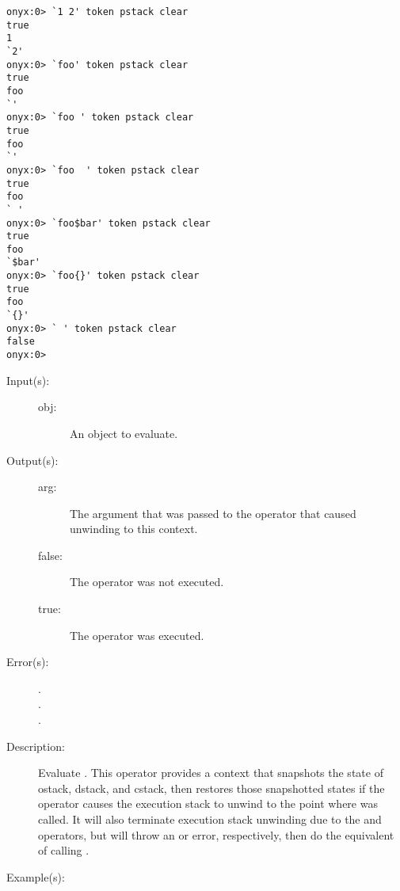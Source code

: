 \begin{description}
\begin{description}
\begin{verbatim}
onyx:0> `1 2' token pstack clear
true
1
`2'
onyx:0> `foo' token pstack clear
true
foo
`'
onyx:0> `foo ' token pstack clear
true
foo
`'
onyx:0> `foo  ' token pstack clear
true
foo
` '
onyx:0> `foo$bar' token pstack clear
true
foo
`$bar'
onyx:0> `foo{}' token pstack clear
true
foo
`{}'
onyx:0> ` ' token pstack clear
false
onyx:0>
		\end{verbatim}
	\end{description}
\label{systemdict:trapped}
\item[{\onyxop{obj}{trapped}{false}}: ]
\item[{\onyxop{obj}{trapped}{arg true}}: ]
	\begin{description}\item[]
	\item[Input(s): ]
		\begin{description}\item[]
		\item[obj: ]
			An object to evaluate.
		\end{description}
	\item[Output(s): ]
		\begin{description}\item[]
		\item[arg: ]
			The argument that was passed to the
			operator that caused unwinding to this
			 context.
		\item[false: ]
			The 
			operator was not executed.
		\item[true: ]
			The 
			operator was executed.
		\end{description}
	\item[Error(s): ]
		\begin{description}\item[]
		\item[.]
		\item[.]
		\item[.]
		\end{description}
	\item[Description: ]
		Evaluate .  This operator provides a context that
		snapshots the state of ostack, dstack, and cstack, then restores
		those snapshotted states if the
		 operator causes
		the execution stack to unwind to the point where
		 was called.  It will also terminate
		execution stack unwinding due to the
		 and
		 operators, but will
		throw an  or
		 error, respectively, then do
		the equivalent of calling
		.
	\item[Example(s): ]\begin{verbatim}


\end{verbatim}
\end{description}
\end{description}
